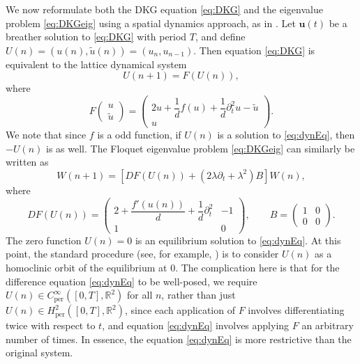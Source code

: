 \documentclass[12pt,reqno]{amsart}
\def\R{{\mathbb R}}
\def\per{\textrm{per}}
\newcommand{\uvec}{\mathbf{u}}
\theoremstyle{definition}
\begin{document}
We now reformulate both the DKG equation \cref{eq:DKG} and the eigenvalue problem \cref{eq:DKGeig} using a spatial dynamics approach, as in \cites{Parker2020,Parker2021}. Let $\uvec(t)$ be a breather solution to \cref{eq:DKG} with period $T$, and define $U(n) = (u(n), \tilde{u}(n)) = ( u_n, u_{n-1} )$. Then equation \cref{eq:DKG} is equivalent to the lattice dynamical system
\begin{equation}\label{eq:dynEq}
U(n+1) = F(U(n)),
\end{equation}
where
\begin{equation}\label{eq:F}
F\begin{pmatrix}u \\ \tilde{u} \end{pmatrix} = 
\begin{pmatrix}2u  + \dfrac{1}{d}f(u) + \dfrac{1}{d} \partial_t^2 u - \tilde{u} \\
u
\end{pmatrix}.
\end{equation}
We note that since $f$ is a odd function, if $U(n)$ is a solution to \cref{eq:dynEq}, then $-U(n)$ is as well. The Floquet eigenvalue problem \cref{eq:DKGeig} can similarly be written as 
\begin{equation}\label{eq:dynEVP}
W(n+1) = \left[ DF(U(n)) + (2 \lambda \partial_t + \lambda^2) B \right] W(n),
\end{equation}
where
\begin{equation}\label{eq:DFU}
DF(U(n)) = \begin{pmatrix}
2 + \dfrac{f'(u(n))}{d} + \dfrac{1}{d}\partial_t^2  & -1 \\ 1 & 0
\end{pmatrix}, \qquad
B = \begin{pmatrix} 1 & 0 \\ 0 & 0 \end{pmatrix}.
\end{equation}
The zero function $U(n) = 0$ is an equilibrium solution to \cref{eq:dynEq}. At this point, the standard procedure (see, for example, \cites{Parker2021,Parker2020,Sandstede1998}) is to consider $U(n)$ as a homoclinic orbit of the equilibrium at 0. The complication here is that for the difference equation \cref{eq:dynEq} to be well-posed, we require $U(n) \in C_\per^\infty([0,T],\R^2)$ for all $n$, rather than just $U(n) \in H^2_\per([0,T], \R^2)$, since each application of $F$ involves differentiating twice with respect to $t$, and equation \cref{eq:dynEq} involves applying $F$ an arbitrary number of times. In essence, the equation \cref{eq:dynEq} is more restrictive than the original system.
\end{document}

